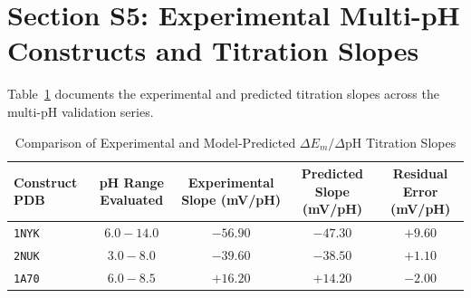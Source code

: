 \documentclass[journal=jcisd8,manuscript=suppinfo]{achemso}
\begin{document}
\section{Section S5: Experimental Multi-pH Constructs and Titration Slopes}

Table~\ref{tab:s5_titrations} documents the experimental and predicted titration slopes across the multi-pH validation series.

\begin{table}[htbp]
\centering
\caption{Comparison of Experimental and Model-Predicted $\Delta E_m / \Delta\text{pH}$ Titration Slopes}
\label{tab:s5_titrations}
\small
\begin{tabular*}{\textwidth}{@{\extracolsep{\fill}}lcccc@{}}
\toprule
Construct PDB & pH Range Evaluated & Experimental Slope (mV/pH) & Predicted Slope (mV/pH) & Residual Error (mV/pH) \\
\midrule
\texttt{1NYK} & $6.0 - 14.0$ & $-56.90$ & $-47.30$ & $+9.60$ \\
\texttt{2NUK} & $3.0 - 8.0$ & $-39.60$ & $-38.50$ & $+1.10$ \\
\texttt{1A70} & $6.0 - 8.5$ & $+16.20$ & $+14.20$ & $-2.00$ \\
\bottomrule
\end{tabular*}
\end{table}
\end{document}
